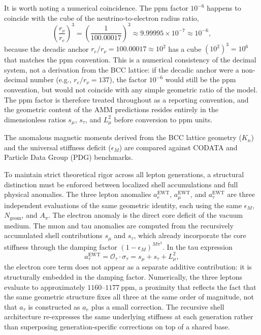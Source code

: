 \documentclass[10pt,a4paper]{article}
\begin{document}
It is worth noting a numerical coincidence. The ppm factor $10^{-6}$
happens to coincide with the cube of the neutrino-to-electron radius
ratio,
\begin{equation}
	\left(\frac{r_\nu}{r_e}\right)^3
	= \left(\frac{1}{100.00017}\right)^3
	\approx 9.99995 \times 10^{-7}
	\approx 10^{-6},
	\label{eq:ppm_ratio}
\end{equation}
because the decadic anchor $r_e/r_\nu = 100.00017 \approx 10^2$ has a
cube $(10^2)^3 = 10^6$ that matches the ppm convention. This is a
numerical consistency of the decimal system, not a derivation from the
BCC lattice: if the decadic anchor were a non-decimal number (e.g.,
$r_e/r_\nu = 137$), the factor $10^{-6}$ would still be the ppm
convention, but would not coincide with any simple geometric ratio of
the model. The ppm factor is therefore treated throughout as a
reporting convention, and the geometric content of the AMM predictions
resides entirely in the dimensionless ratios $s_\mu$, $s_\tau$, and
$L_\mu^2$ before conversion to ppm units.

The anomalous magnetic moments derived from the BCC lattice geometry ($K_n$) 
and the universal stiffness deficit ($\epsilon_M$) are compared against CODATA 
and Particle Data Group (PDG) benchmarks. 

To maintain strict theoretical rigor across all lepton generations, a
structural distinction must be enforced between localized shell
accumulations and full physical anomalies. The three lepton anomalies
$a_e^{\text{EWT}}$, $a_\mu^{\text{EWT}}$, and $a_\tau^{\text{EWT}}$ are
three independent evaluations of the same geometric identity, each
using the same $\epsilon_M$, $N_{\text{geom}}$, and $A_\pi$. The
electron anomaly is the direct core deficit of the vacuum medium. The
muon and tau anomalies are computed from the recursively accumulated
shell contributions $s_\mu$ and $s_\tau$, which already incorporate
the core stiffness through the damping factor
$(1-\epsilon_M)^{M\pi^3}$. In the tau expression
\begin{equation}
	a_\tau^{\text{EWT}}
	= \mathcal{O}_\tau \cdot \sigma_\tau
	= s_\mu + s_\tau + L_\mu^2,
	\label{eq:a_tau_final}
\end{equation}
the electron core term does not appear as a separate additive
contribution: it is structurally embedded in the damping factor.
Numerically, the three leptons evaluate to approximately
$1160$--$1177\ \text{ppm}$, a proximity that reflects the fact that
the same geometric structure fixes all three at the same order of
magnitude, not that $a_\tau$ is constructed as $a_e$ plus a small
correction. The recursive shell architecture re-expresses the same
underlying stiffness at each generation rather than superposing
generation-specific corrections on top of a shared base.
\end{document}
